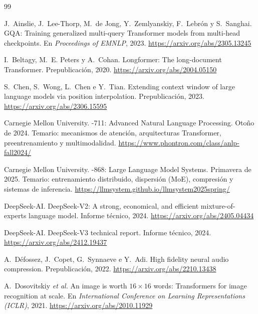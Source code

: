\begin{thebibliography}{99}
\small
\def\UrlBreaks{\do\/\do-}

J.~Ainslie, J.~Lee-Thorp, M.~de Jong, Y.~Zemlyanskiy, F.~Lebrón y S.~Sanghai.
\newblock GQA: Training generalized multi-query Transformer models from multi-head checkpoints.
\newblock En \emph{Proceedings of EMNLP}, 2023.
\newblock \url{https://arxiv.org/abs/2305.13245}

I.~Beltagy, M.~E. Peters y A.~Cohan.
\newblock Longformer: The long-document Transformer.
\newblock Prepublicación, 2020.
\newblock \url{https://arxiv.org/abs/2004.05150}

S.~Chen, S.~Wong, L.~Chen e Y.~Tian.
\newblock Extending context window of large language models via position interpolation.
\newblock Prepublicación, 2023.
\newblock \url{https://arxiv.org/abs/2306.15595}

Carnegie Mellon University.
-711: Advanced Natural Language Processing.
\newblock Otoño de 2024. Temario: mecanismos de atención, arquitecturas Transformer, preentrenamiento y multimodalidad.
\newblock \url{https://www.phontron.com/class/anlp-fall2024/}

Carnegie Mellon University.
-868: Large Language Model Systems.
\newblock Primavera de 2025. Temario: entrenamiento distribuido, dispersión (MoE), compresión y sistemas de inferencia.
\newblock \url{https://llmsystem.github.io/llmsystem2025spring/}

DeepSeek-AI.
\newblock DeepSeek-V2: A strong, economical, and efficient mixture-of-experts language model.
\newblock Informe técnico, 2024.
\newblock \url{https://arxiv.org/abs/2405.04434}

DeepSeek-AI.
\newblock DeepSeek-V3 technical report.
\newblock Informe técnico, 2024.
\newblock \url{https://arxiv.org/abs/2412.19437}

A.~Défossez, J.~Copet, G.~Synnaeve e Y.~Adi.
\newblock High fidelity neural audio compression.
\newblock Prepublicación, 2022.
\newblock \url{https://arxiv.org/abs/2210.13438}

A.~Dosovitskiy \emph{et al.}
\newblock An image is worth $16\times 16$ words: Transformers for image recognition at scale.
\newblock En \emph{International Conference on Learning Representations (ICLR)}, 2021.
\newblock \url{https://arxiv.org/abs/2010.11929}


\end{thebibliography}
